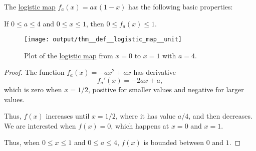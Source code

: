 \begin{proposition}\label{thm:def:logistic_map}
  The \hyperref[def:logistic_map]{logistic map} \( f_a(x) = a x (1 - x) \) has the following basic properties:
  \begin{thmenum}
     If \( 0 \leq a \leq 4 \) and \( 0 \leq x \leq 1 \), then \( 0 \leq f_a(x) \leq 1 \).

    \begin{figure}[!ht]
      \centering
      \texttt{[image: output/thm\_\_def\_\_logistic\_map\_\_unit]}
      \caption{Plot of the \hyperref[def:logistic_map]{logistic map} from \( x = 0 \) to \( x = 1 \) with \( a = 4 \).}\label{fig:thm:def:logistic_map/unit}
    \end{figure}
  \end{thmenum}
\end{proposition}
\begin{proof}
   The function \( f_a(x) = -ax^2 + ax \) has derivative
  \begin{equation*}
    f_a'(x) = -2ax + a,
  \end{equation*}
  which is zero when \( x = 1 / 2 \), positive for smaller values and negative for larger values.

  Thus, \( f(x) \) increases until \( x = 1 / 2 \), where it has value \( a / 4 \), and then decreases. We are interested when \( f(x) = 0 \), which happens at \( x = 0 \) and \( x = 1 \).

  Thus, when \( 0 \leq x \leq 1 \) and \( 0 \leq a \leq 4 \), \( f(x) \) is bounded between \( 0 \) and \( 1 \).
\end{proof}

